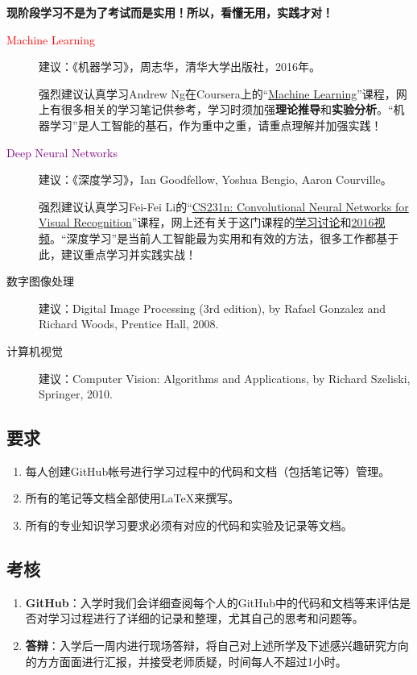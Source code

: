 \documentclass[14pt,a4paper]{extarticle}
\begin{document}
\textbf{现阶段学习不是为了考试而是实用！所以，看懂无用，实践才对！}

\begin{description}
\item[\textcolor{red}{Machine Learning}] 建议：《机器学习》，周志华，清华大学出版社，2016年。

强烈建议认真学习Andrew Ng在Coursera上的“\href{https://www.coursera.org/learn/machine-learning}{Machine Learning}”课程，网上有很多相关的学习笔记供参考，学习时须加强\textbf{理论推导}和\textbf{实验分析}。“机器学习”是人工智能的基石，作为重中之重，请重点理解并加强实践！
\item[\textcolor{purple}{Deep Neural Networks}] 建议：《深度学习》，Ian Goodfellow, Yoshua Bengio, Aaron Courville。

强烈建议认真学习Fei-Fei Li的“\href{http://vision.stanford.edu/teaching.html}{CS231n: Convolutional Neural Networks for Visual Recognition}”课程，网上还有关于这门课程的\href{https://www.reddit.com/r/cs231n/}{学习讨论}和\href{https://www.youtube.com/playlist?list=PLkt2uSq6rBVctENoVBg1TpCC7OQi31AlC}{2016视频}。“深度学习”是当前人工智能最为实用和有效的方法，很多工作都基于此，建议重点学习并实践实战！
\item[数字图像处理] 建议：Digital Image Processing (3rd edition), by Rafael Gonzalez and Richard Woods, Prentice Hall, 2008.
\item[计算机视觉] 建议：Computer Vision: Algorithms and Applications, by Richard Szeliski, Springer, 2010.
\end{description}

\subsection{要求}

\begin{enumerate}
\item 每人创建GitHub帐号进行学习过程中的代码和文档（包括笔记等）管理。
\item 所有的笔记等文档全部使用\LaTeX{}来撰写。
\item 所有的专业知识学习要求必须有对应的代码和实验及记录等文档。
\end{enumerate}

\subsection{考核}

\begin{enumerate}
\item \textbf{GitHub}：入学时我们会详细查阅每个人的GitHub中的代码和文档等来评估是否对学习过程进行了详细的记录和整理，尤其自己的思考和问题等。
\item \textbf{答辩}：入学后一周内进行现场答辩，将自己对上述所学及下述感兴趣研究方向的方方面面进行汇报，并接受老师质疑，时间每人不超过1小时。
\end{enumerate}
\end{document}

